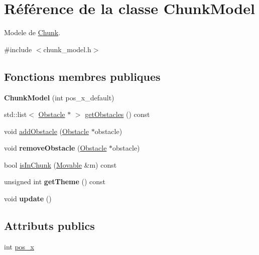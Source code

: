 \hypertarget{class_chunk_model}{\section{Référence de la classe Chunk\+Model}
\label{class_chunk_model}
}


Modele de \hyperlink{class_chunk}{Chunk}.  




{\ttfamily \#include $<$chunk\+\_\+model.\+h$>$}

\subsection*{Fonctions membres publiques}
\begin{DoxyCompactItemize}
\item 
\hypertarget{class_chunk_model_ad0f9adf9a9f681a0204c6fd2fb113896}{{\bfseries Chunk\+Model} (int pos\+\_\+x\+\_\+default)}\label{class_chunk_model_ad0f9adf9a9f681a0204c6fd2fb113896}

\item 
std\+::list$<$ \hyperlink{class_obstacle}{Obstacle} $\ast$ $>$ \hyperlink{class_chunk_model_aec712a5ac3633889c8acbaebc21bd77e}{get\+Obstacles} () const 
\item 
void \hyperlink{class_chunk_model_a5732db0c1f3d060d2a40972fd58d6db1}{add\+Obstacle} (\hyperlink{class_obstacle}{Obstacle} $\ast$obstacle)
\item 
\hypertarget{class_chunk_model_a5f40b2b3fd557a733f55bf8ada7a25c2}{void {\bfseries remove\+Obstacle} (\hyperlink{class_obstacle}{Obstacle} $\ast$obstacle)}\label{class_chunk_model_a5f40b2b3fd557a733f55bf8ada7a25c2}

\item 
bool \hyperlink{class_chunk_model_a9ab1e4450f60b429c0abe43bbc56a327}{is\+In\+Chunk} (\hyperlink{class_movable}{Movable} \&m) const 
\item 
\hypertarget{class_chunk_model_a0ab3fa47bf41e063974018aca1b9750d}{unsigned int {\bfseries get\+Theme} () const }\label{class_chunk_model_a0ab3fa47bf41e063974018aca1b9750d}

\item 
\hypertarget{class_chunk_model_a31d36f471f44a5083e31c281258db44d}{void {\bfseries update} ()}\label{class_chunk_model_a31d36f471f44a5083e31c281258db44d}

\end{DoxyCompactItemize}
\subsection*{Attributs publics}
\begin{DoxyCompactItemize}
\item 
int \hyperlink{class_chunk_model_a6b6f83cac17128250d32dddb026b4792}{pos\+\_\+x}
\end{DoxyCompactItemize}


